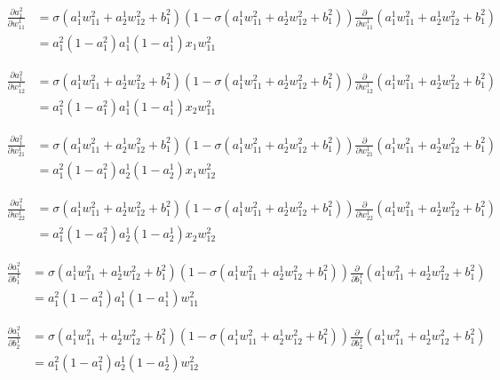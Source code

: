 \documentclass{article}
\begin{document}
\begin{align*}
\frac{\partial a^2_1}{\partial w^1_{11}} &= \sigma(a^1_1 w^2_{11} + a^1_2 w^2_{12} + b^2_1)(1 - \sigma(a^1_1 w^2_{11} + a^1_2 w^2_{12} + b^2_1)) \frac{\partial}{\partial w^1_{11}}(a^1_1 w^2_{11} + a^1_2 w^2_{12} + b^2_1)\\
&= a^2_1(1 - a^2_1)a^1_1(1 - a^1_1)x_1w^2_{11}
\end{align*}

\begin{align*}
\frac{\partial a^2_1}{\partial w^1_{12}} &= \sigma(a^1_1 w^2_{11} + a^1_2 w^2_{12} + b^2_1)(1 - \sigma(a^1_1 w^2_{11} + a^1_2 w^2_{12} + b^2_1)) \frac{\partial}{\partial w^1_{12}}(a^1_1 w^2_{11} + a^1_2 w^2_{12} + b^2_1)\\
&= a^2_1(1 - a^2_1)a^1_1(1 - a^1_1)x_2w^2_{11}
\end{align*}

\begin{align*}
\frac{\partial a^2_1}{\partial w^1_{21}} &= \sigma(a^1_1 w^2_{11} + a^1_2 w^2_{12} + b^2_1)(1 - \sigma(a^1_1 w^2_{11} + a^1_2 w^2_{12} + b^2_1)) \frac{\partial}{\partial w^1_{21}}(a^1_1 w^2_{11} + a^1_2 w^2_{12} + b^2_1)\\
&= a^2_1(1 - a^2_1)a^1_2(1 - a^1_2)x_1w^2_{12}
\end{align*}

\begin{align*}
\frac{\partial a^2_1}{\partial w^1_{22}} &= \sigma(a^1_1 w^2_{11} + a^1_2 w^2_{12} + b^2_1)(1 - \sigma(a^1_1 w^2_{11} + a^1_2 w^2_{12} + b^2_1)) \frac{\partial}{\partial w^1_{22}}(a^1_1 w^2_{11} + a^1_2 w^2_{12} + b^2_1)\\
&= a^2_1(1 - a^2_1)a^1_2(1 - a^1_2)x_2w^2_{12}
\end{align*}

\begin{align*}
\frac{\partial a^2_1}{\partial b^1_1} &= \sigma(a^1_1 w^2_{11} + a^1_2 w^2_{12} + b^2_1)(1 - \sigma(a^1_1 w^2_{11} + a^1_2 w^2_{12} + b^2_1)) \frac{\partial}{\partial b^1_1}(a^1_1 w^2_{11} + a^1_2 w^2_{12} + b^2_1)\\
&= a^2_1(1 - a^2_1)a^1_1(1 - a^1_1)w^2_{11}
\end{align*}

\begin{align*}
\frac{\partial a^2_1}{\partial b^1_2} &= \sigma(a^1_1 w^2_{11} + a^1_2 w^2_{12} + b^2_1)(1 - \sigma(a^1_1 w^2_{11} + a^1_2 w^2_{12} + b^2_1)) \frac{\partial}{\partial b^1_2}(a^1_1 w^2_{11} + a^1_2 w^2_{12} + b^2_1)\\
&= a^2_1(1 - a^2_1)a^1_2(1 - a^1_2)w^2_{12}
\end{align*}
\end{document}
